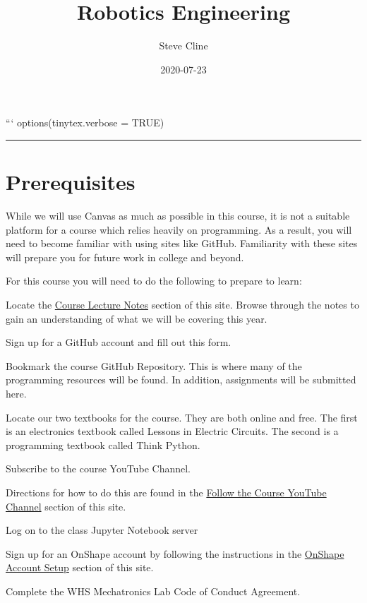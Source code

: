 \documentclass[
]{book}
\title{Robotics Engineering}
\author{Steve Cline}
\date{2020-07-23}
\begin{document}
\maketitle

{
\setcounter{tocdepth}{1}
\tableofcontents
}
```
options(tinytex.verbose = TRUE)

\begin{center}\rule{0.5\linewidth}{0.5pt}\end{center}

\hypertarget{prerequisites}{%
\chapter{Prerequisites}\label{prerequisites}}

While we will use Canvas as much as possible in this course, it is not a suitable platform for a course which relies heavily on programming. As a result, you will need to become familiar with using sites like GitHub. Familiarity with these sites will prepare you for future work in college and beyond.

For this course you will need to do the following to prepare to learn:

Locate the \protect\hyperlink{course-lecture-notes}{Course Lecture Notes} section of this site. Browse through the notes to gain an understanding of what we will be covering this year.

Sign up for a GitHub account and fill out this form.

Bookmark the course GitHub Repository. This is where many of the programming resources will be found. In addition, assignments will be submitted here.

Locate our two textbooks for the course. They are both online and free. The first is an electronics textbook called Lessons in Electric Circuits. The second is a programming textbook called Think Python.

Subscribe to the course YouTube Channel.

Directions for how to do this are found in the \protect\hyperlink{follow-the-course-youtube-channel}{Follow the Course YouTube Channel} section of this site.

Log on to the class Jupyter Notebook server

Sign up for an OnShape account by following the instructions in the \protect\hyperlink{onshape-account-setup}{OnShape Account Setup} section of this site.

Complete the WHS Mechatronics Lab Code of Conduct Agreement.
\end{document}
